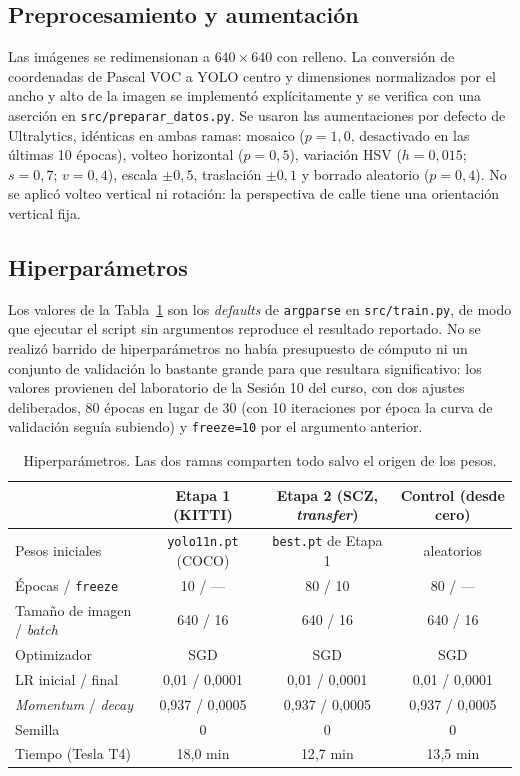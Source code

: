 \documentclass[10pt,a4paper]{article}
\begin{document}
\subsection{Preprocesamiento y aumentación}
Las imágenes se redimensionan a $640\times640$ con relleno. La conversión de coordenadas
de Pascal VOC a YOLO centro y dimensiones normalizados por el ancho y alto de la
imagen se implementó explícitamente y se verifica con una aserción en
\texttt{src/preparar\_datos.py}. Se usaron las aumentaciones por defecto de Ultralytics,
idénticas en ambas ramas: mosaico ($p=1{,}0$, desactivado en las últimas 10 épocas),
volteo horizontal ($p=0{,}5$), variación HSV ($h=0{,}015$; $s=0{,}7$; $v=0{,}4$), escala
$\pm0{,}5$, traslación $\pm0{,}1$ y borrado aleatorio ($p=0{,}4$). No se aplicó volteo
vertical ni rotación: la perspectiva de calle tiene una orientación vertical fija.

\subsection{Hiperparámetros}
Los valores de la Tabla~\ref{tab:hp} son los \emph{defaults} de \texttt{argparse} en
\texttt{src/train.py}, de modo que ejecutar el script sin argumentos reproduce el
resultado reportado. No se realizó barrido de hiperparámetros no había presupuesto de
cómputo ni un conjunto de validación lo bastante grande para que resultara
significativo: los valores provienen del laboratorio de la Sesión 10 del curso, con
dos ajustes deliberados, 80 épocas en lugar de 30 (con 10 iteraciones por época la curva
de validación seguía subiendo) y \texttt{freeze=10} por el argumento anterior.

\begin{table}[H]
\centering\footnotesize
\caption{Hiperparámetros. Las dos ramas comparten todo salvo el origen de los pesos.}
\label{tab:hp}
\begin{tabular}{@{}lccc@{}}
\toprule
& \textbf{Etapa 1 (KITTI)} & \textbf{Etapa 2 (SCZ, \emph{transfer})} & \textbf{Control (desde cero)}\\
\midrule
Pesos iniciales & \texttt{yolo11n.pt} (COCO) & \texttt{best.pt} de Etapa 1 & aleatorios\\
Épocas / \texttt{freeze} & 10 / --- & 80 / 10 & 80 / ---\\
Tamaño de imagen / \emph{batch} & 640 / 16 & 640 / 16 & 640 / 16\\
Optimizador & SGD & SGD & SGD\\
LR inicial / final & 0{,}01 / 0{,}0001 & 0{,}01 / 0{,}0001 & 0{,}01 / 0{,}0001\\
\emph{Momentum} / \emph{decay} & 0{,}937 / 0{,}0005 & 0{,}937 / 0{,}0005 & 0{,}937 / 0{,}0005\\
Semilla & 0 & 0 & 0\\
Tiempo (Tesla T4) & 18{,}0 min & 12{,}7 min & 13{,}5 min\\
\bottomrule
\end{tabular}
\end{table}
\end{document}
